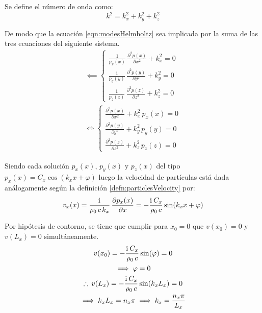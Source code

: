 \documentclass[a5paper,12pt,twoside]{book}
\begin{document}
Se define el número de onda como:
\begin{equation}
    k^2 = k_x^2 + k_y^2 + k_z^2
    \label{eqn:modesk^2}
\end{equation}

De modo que la ecuación \ref{eqn:modesHelmholtz} sea implicada por la suma de las tres ecuaciones del siguiente sistema.
\begin{gather*}
    \impliedby
    \left\{
    \begin{aligned}
        \frac{1}{p_x(x)} \, \frac{\partial^2 p(x)}{\partial x^2} + k_x^2 = 0
        \\
        \frac{1}{p_y(y)} \, \frac{\partial^2 p(y)}{\partial y^2} + k_y^2 = 0
        \\
        \frac{1}{p_z(z)} \, \frac{\partial^2 p(z)}{\partial z^2} + k_z^2 = 0
    \end{aligned}
    \right.
    \\
    \iff
    \left\{
    \begin{aligned}
        \frac{\partial^2 p(x)}{\partial x^2} + k_x^2 \, p_x(x) = 0
        \\
        \frac{\partial^2 p(y)}{\partial y^2} + k_y^2 \, p_y(y) = 0
        \\
        \frac{\partial^2 p(z)}{\partial z^2} + k_z^2 \, p_z(z) = 0
    \end{aligned}
    \right.
\end{gather*}

Siendo cada solución $p_x(x)$, $p_y(x)$ y $p_z(x)$ del tipo $p_x(x) = C_x \cos (k_x x + \varphi)$ luego la velocidad de partículas está dada análogamente según la definición \ref{defn:particlesVelocity} por:
\begin{equation*}
    v_x(x) = \frac{\mathrm{i}\mkern1mu}{\rho_0 \, c \, k_x} \, \frac{\partial p_x(x)}{\partial x} = - \frac{\mathrm{i}\mkern1mu \, C_x}{\rho_0 \, c} \sin (k_x x + \varphi)
\end{equation*}

Por hipótesis de contorno, se tiene que cumplir para $x_0=0$ que $v(x_0) = 0$ y $v(L_x) = 0$ simultáneamente.
\begin{gather*}
    v(x_0) = - \frac{\mathrm{i}\mkern1mu \, C_x}{\rho_0 \, c} \sin (\varphi) = 0
    \\
    \implies \varphi = 0
    \\
    \therefore \, v(L_x) = - \frac{\mathrm{i}\mkern1mu \, C_x}{\rho_0 \, c} \sin (k_x L_x) = 0
    \\
    \implies k_x L_x = n_x \pi \implies k_x = \frac{n_x \pi}{L_x}
\end{gather*}
\end{document}
